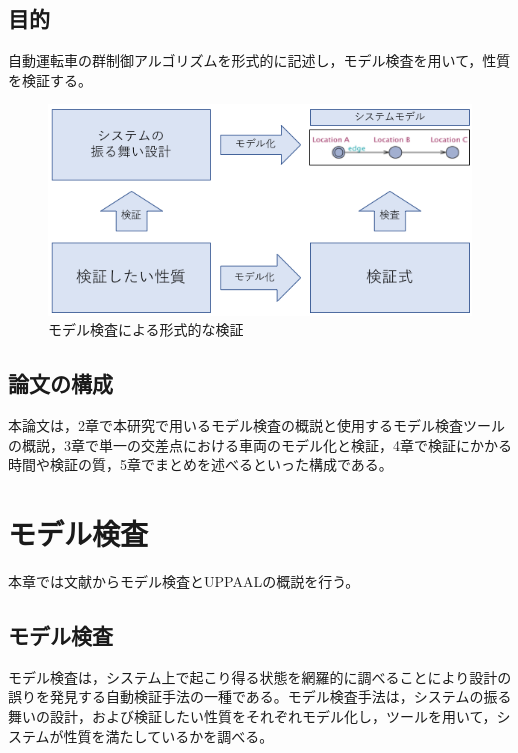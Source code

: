 \documentclass{tpu-sotu}
\begin{document}
	\section{目的}
	自動運転車の群制御アルゴリズムを形式的に記述し，モデル検査を用いて，性質を検証する。
	\begin{figure}[htbp]
	\centering
	\includegraphics[width=150mm]{ModelVerification.png}
	\caption{モデル検査による形式的な検証}
	\label{ModelV}
	\end{figure}
	\section{論文の構成}
	本論文は，2章で本研究で用いるモデル検査の概説と使用するモデル検査ツールの概説，3章で単一の交差点における車両のモデル化と検証，4章で検証にかかる時間や検証の質，5章でまとめを述べるといった構成である。
\chapter{モデル検査}
本章では文献\cite{a1}からモデル検査とUPPAAL\cite{u1}の概説を行う。
	\section{モデル検査}
	モデル検査は，システム上で起こり得る状態を網羅的に調べることにより設計の誤りを発見する自動検証手法の一種である。モデル検査手法は，システムの振る舞いの設計，および検証したい性質をそれぞれモデル化し，ツールを用いて，システムが性質を満たしているかを調べる。
	
\end{document}
